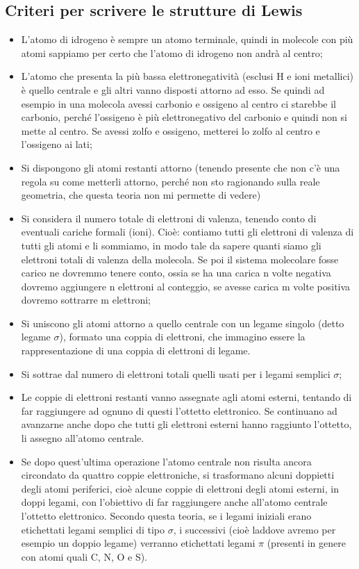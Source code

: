 \subsection{Criteri per scrivere le strutture di Lewis}
\begin{itemize}
    \item L'atomo di idrogeno è sempre un atomo terminale, quindi in molecole con più atomi sappiamo per certo che l'atomo di idrogeno non andrà al centro;
    \item L'atomo che presenta la più bassa elettronegatività (esclusi H e ioni metallici) è quello centrale e gli altri vanno disposti attorno ad esso. Se quindi ad esempio in una molecola avessi carbonio e ossigeno al centro ci starebbe il carbonio, perché l'ossigeno è più elettronegativo del carbonio e quindi non si mette al centro. Se avessi zolfo e ossigeno, metterei lo zolfo al centro e l'ossigeno ai lati;
    \item Si dispongono gli atomi restanti attorno (tenendo presente che non c'è una regola su come metterli attorno, perché non sto ragionando sulla reale geometria, che questa teoria non mi permette di vedere)
    \item Si considera il numero totale di elettroni di valenza, tenendo conto di eventuali cariche formali (ioni). Cioè: contiamo tutti gli elettroni di valenza di tutti gli atomi e li sommiamo, in modo tale da sapere quanti siamo gli elettroni totali di valenza della molecola. Se poi il sistema molecolare fosse carico ne dovremmo tenere conto, ossia se ha una carica n volte negativa dovremo aggiungere n elettroni al conteggio, se avesse carica m volte positiva dovremo sottrarre m elettroni;
    \item Si uniscono gli atomi attorno a quello centrale con un legame singolo (detto legame $\sigma$), formato una coppia di elettroni, che immagino essere la rappresentazione di una coppia di elettroni di legame. 
    
    \item Si sottrae dal numero di elettroni totali quelli usati per i legami semplici $\sigma$;
    \item Le coppie di elettroni restanti vanno assegnate agli atomi esterni, tentando di far raggiungere ad ognuno di questi l'ottetto elettronico. Se continuano ad avanzarne anche dopo che tutti gli elettroni esterni hanno raggiunto l'ottetto, li assegno all'atomo centrale.
    \item Se dopo quest'ultima operazione l'atomo centrale non risulta ancora circondato da quattro coppie elettroniche, si trasformano alcuni doppietti degli atomi periferici, cioè alcune coppie di elettroni degli atomi esterni, in doppi legami, con l'obiettivo di far raggiungere anche all'atomo centrale l'ottetto elettronico. Secondo questa teoria, se i  legami iniziali erano etichettati legami semplici di tipo $\sigma$, i successivi (cioè laddove avremo per esempio un doppio legame) verranno etichettati legami $\pi$ (presenti in genere con atomi quali C, N, O e S).
\end{itemize}

